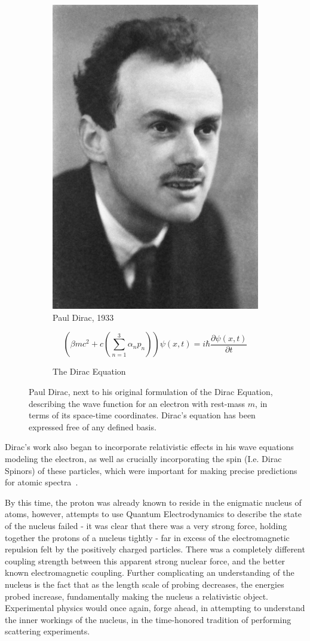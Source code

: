 \begin{figure}[ht]
	\centering
	\begin{subfigure}{.4\textwidth}
		\centering
		\includegraphics[width=0.4\linewidth]{./figures/pauldirac.jpg}
		\caption{Paul Dirac, 1933  \cite{NobelFoundation1933}}
		\label{fig:pauldirac}
	\end{subfigure}%
	\begin{subfigure}{0.6\textwidth}
		\centering
		\begin{equation}
			\left(\beta mc^2 + c\left(\sum_{n \mathop =1}^{3}\alpha_n p_n\right)\right) \psi (x,t) = i \hbar \frac{\partial\psi(x,t) }{\partial t}
		\end{equation}
		\caption{The Dirac Equation}
		\label{eq:diracquation}
	\end{subfigure}
	\caption{ 
		Paul Dirac, next to his original formulation of the Dirac Equation,
		describing the wave function for an electron with rest-mass $m$, in terms of
		its space-time coordinates. Dirac's equation has been expressed free of any
    defined basis.
	}
	\label{fig:thomsonrays}
\end{figure}

Dirac's work also began to incorporate relativistic effects in his wave
equations modeling the electron, as well as crucially incorporating the spin
(I.e. Dirac Spinors) of these particles, which were important for making precise
predictions for atomic spectra~\cite{Dirac}.

By this time, the proton was already known to reside in the enigmatic nucleus of
atoms, however, attempts to use Quantum Electrodynamics to describe the state of
the nucleus failed - it was clear that there was a very strong force, holding
together the protons of a nucleus tightly - far in excess of the electromagnetic
repulsion felt by the positively charged particles. There was a completely
different coupling strength between this apparent strong nuclear force, and the
better known electromagnetic coupling. Further complicating an understanding of
the nucleus is the fact that as the length scale of probing decreases, the
energies probed increase, fundamentally making the nucleus a relativistic
object. Experimental physics would once again, forge ahead, in attempting to
understand the inner workings of the nucleus, in the time-honored tradition of
performing scattering experiments.

